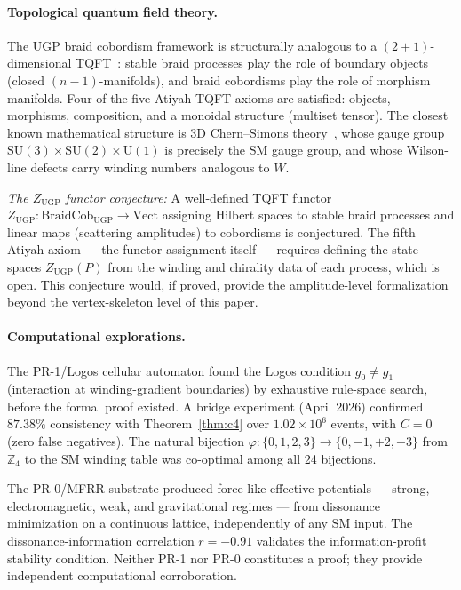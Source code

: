 \documentclass[12pt]{article}
\theoremstyle{remark}
\newcommand{\UGP}{\mathrm{UGP}}
\begin{document}
\paragraph{Topological quantum field theory.}
The UGP braid cobordism framework is structurally analogous to a
$(2+1)$-dimensional TQFT~\cite{atiyah88}: stable braid processes play the role
of boundary objects (closed $(n-1)$-manifolds), and braid cobordisms play the
role of morphism manifolds.  Four of the five Atiyah TQFT axioms are satisfied:
objects, morphisms, composition, and a monoidal structure (multiset tensor).
The closest known mathematical structure is 3D Chern--Simons theory~\cite{witten89},
whose gauge group $\mathrm{SU}(3) \times \mathrm{SU}(2) \times \mathrm{U}(1)$
is precisely the SM gauge group, and whose Wilson-line defects carry winding
numbers analogous to $W$.

\emph{The $Z_\UGP$ functor conjecture:} A well-defined TQFT functor
$Z_\UGP : \mathrm{BraidCob}_\UGP \to \mathrm{Vect}$ assigning Hilbert spaces
to stable braid processes and linear maps (scattering amplitudes) to cobordisms
is conjectured.  The fifth Atiyah axiom --- the functor assignment itself ---
requires defining the state spaces $Z_\UGP(P)$ from the winding and chirality
data of each process, which is open.  This conjecture would, if proved, provide
the amplitude-level formalization beyond the vertex-skeleton level of this paper.

\paragraph{Computational explorations.}
The PR-1/Logos cellular automaton found the Logos condition $g_0 \neq g_1$
(interaction at winding-gradient boundaries) by exhaustive rule-space search,
before the formal proof existed.  A bridge experiment (April 2026)
confirmed $87.38\%$ consistency with Theorem~\ref{thm:c4} over
$1.02 \times 10^6$ events, with $C = 0$ (zero false negatives).  The natural
bijection $\varphi: \{0,1,2,3\} \to \{0,-1,+2,-3\}$ from $\mathbb{Z}_4$ to
the SM winding table was co-optimal among all 24 bijections.

The PR-0/MFRR substrate produced force-like effective potentials --- strong, electromagnetic, weak, and gravitational regimes --- from dissonance
minimization on a continuous lattice, independently of any SM input.  The
dissonance-information correlation $r = -0.91$ validates the information-profit
stability condition.  Neither PR-1 nor PR-0 constitutes a proof; they provide
independent computational corroboration.
\end{document}
